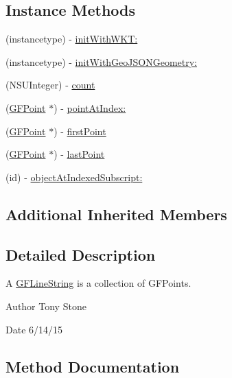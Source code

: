 \subsection*{Instance Methods}
\begin{DoxyCompactItemize}
\item 
(instancetype) -\/ \hyperlink{interface_g_f_line_string_a261a4d08fe5cb35f935d265c3a97f453}{init\+With\+W\+K\+T\+:}
\item 
(instancetype) -\/ \hyperlink{interface_g_f_line_string_ad7a913bc12b6099982229190d1debd71}{init\+With\+Geo\+J\+S\+O\+N\+Geometry\+:}
\item 
(N\+S\+U\+Integer) -\/ \hyperlink{interface_g_f_line_string_a58fc2980cff73581d57943a64d60ddba}{count}
\item 
(\hyperlink{interface_g_f_point}{G\+F\+Point} $\ast$) -\/ \hyperlink{interface_g_f_line_string_a51963123a916fd666131859f571e2609}{point\+At\+Index\+:}
\item 
(\hyperlink{interface_g_f_point}{G\+F\+Point} $\ast$) -\/ \hyperlink{interface_g_f_line_string_a1fc7f9d3388d5237cb824573e8f6f71f}{first\+Point}
\item 
(\hyperlink{interface_g_f_point}{G\+F\+Point} $\ast$) -\/ \hyperlink{interface_g_f_line_string_aa9db281010dcfe2ab30b697710859dde}{last\+Point}
\item 
(id) -\/ \hyperlink{interface_g_f_line_string_a6278fa4d628e0eba39d8cfdb2ba0030e}{object\+At\+Indexed\+Subscript\+:}
\end{DoxyCompactItemize}
\subsection*{Additional Inherited Members}


\subsection{Detailed Description}
A \hyperlink{interface_g_f_line_string}{G\+F\+Line\+String} is a collection of G\+F\+Points. 

\begin{DoxyAuthor}{Author}
Tony Stone 
\end{DoxyAuthor}
\begin{DoxyDate}{Date}
6/14/15 
\end{DoxyDate}


\subsection{Method Documentation}
\hypertarget{interface_g_f_line_string_a261a4d08fe5cb35f935d265c3a97f453}{}
